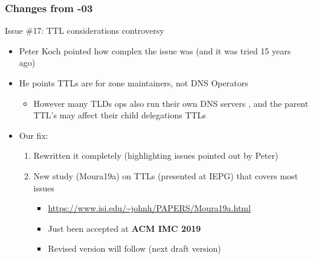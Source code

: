\documentclass[11pt,show 
notes,notheorems,noamsthm,blank]{beamer} %
\begin{document}
\begin{frame}
\frametitle{Changes from -03}
\begin{block}{ Issue \#17: TTL considerations controversy }
\begin{itemize}
\item Peter Koch pointed how complex the issue was (and it was tried 15 years ago)
\item He points TTLs are for zone maintainers, not DNS Operators 
\begin{itemize}
 \item However many TLDs ops also run their own DNS servers
   , and the parent TTL's may affect their child delegations TTLs
 
\end{itemize}
\item Our fix:
\begin{enumerate}
 \item Rewritten  it completely (highlighting issues pointed out by Peter)
 \item New study (Moura19a) on TTLs (presented at IEPG) that covers most issues
  \begin{itemize}
  \item \url{https://www.isi.edu/~johnh/PAPERS/Moura19a.html}
  \item Just been accepted at \textbf{ACM IMC 2019}
  \item Revised version will follow (next draft version)
 \end{itemize}

\end{enumerate}

\end{itemize} 

 
\end{block}
\end{frame}
\end{document}

